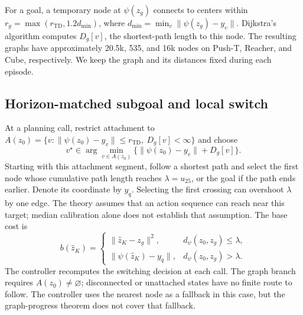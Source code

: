 \documentclass{article}
\newcommand{\Htd}{r_{\mathrm{TD}}}
\newcommand{\dd}{d_{\psi}}
\theoremstyle{definition}
\theoremstyle{remark}
\begin{document}
For a goal, a temporary node at $\psi(z_g)$ connects to centers within
$r_g=\max(\Htd,1.2d_{\min})$, where $d_{\min}=\min_v\|\psi(z_g)-y_v\|$.
Dijkstra's algorithm computes $D_g[v]$, the shortest-path length to this node.
The resulting graphs have approximately 20.5k, 535, and 16k nodes on Push-T, Reacher,
and Cube, respectively. We keep the graph and its distances fixed during each episode.

\subsection{Horizon-matched subgoal and local switch}
\label{sec:subgoal}
At a planning call, restrict attachment to
$A(z_0)=\{v:\|\psi(z_0)-y_v\|\le\Htd,\ D_g[v]<\infty\}$ and choose
\begin{equation}
 v^\star\in\arg\min_{v\in A(z_0)}
       \{\|\psi(z_0)-y_v\|+D_g[v]\}.
 \label{eq:startnode}
\end{equation}
Starting with this attachment segment, follow a shortest path and select the first node
whose cumulative path length reaches $\lambda=u_{25}$, or the goal if the path ends earlier.
Denote its coordinate by $y_q$. Selecting the first crossing can overshoot $\lambda$
by one edge. The theory assumes that an action sequence can reach near this target;
median calibration alone does not establish that assumption.
The base cost is
\begin{equation}
 b(\hat z_K)=
 \begin{cases}
   \|\hat z_K-z_g\|^2,& \dd(z_0,z_g)\le\lambda,\\
   \|\psi(\hat z_K)-y_q\|,& \dd(z_0,z_g)>\lambda .
 \end{cases}
 \label{eq:subgoal}
\end{equation}
The controller recomputes the switching decision at each call.
The graph branch requires $A(z_0)\ne\varnothing$; disconnected or unattached states
have no finite route to follow. The controller uses the nearest node as a fallback in this case,
but the graph-progress theorem does not cover that fallback.
\end{document}
